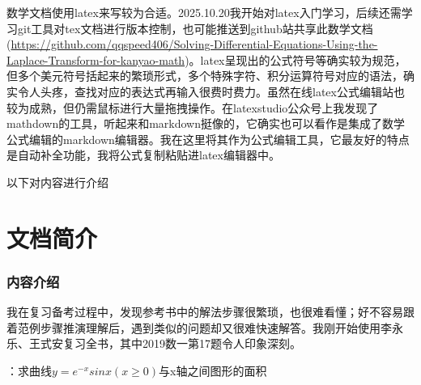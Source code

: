 \documentclass[12pt]{report}
\begin{document}
   数学文档使用latex来写较为合适。2025.10.20我开始对latex入门学习，后续还需学习git工具对tex文档进行版本控制，也可能推送到github站共享此数学文档(\href{https://github.com/qqspeed406/Solving-Differential-Equations-Using-the-Laplace-Transform-for-kanyao-math}{https://github.com/qqspeed406/Solving-Differential-Equations-Using-the-Laplace-Transform-for-kanyao-math})。latex呈现出的公式符号等确实较为规范，但多个美元符号括起来的繁琐形式，多个特殊字符、积分运算符号对应的语法，确实令人头疼，查找对应的表达式再输入很费时费力。虽然在线latex公式编辑站也较为成熟，但仍需鼠标进行大量拖拽操作。在latexstudio公众号上我发现了mathdown的工具，听起来和markdown挺像的，它确实也可以看作是集成了数学公式编辑的markdown编辑器。我在这里将其作为公式编辑工具，它最友好的特点是自动补全功能，我将公式复制粘贴进latex编辑器中。
   
   以下对内容进行介绍
   
   \clearpage
   
   \chapter*{文档简介}
   \subsection*{\centering 内容介绍}
   我在复习备考过程中，发现参考书中的解法步骤很繁琐，也很难看懂；好不容易跟着范例步骤推演理解后，遇到类似的问题却又很难快速解答。我刚开始使用李永乐、王式安复习全书，其中2019数一第17题令人印象深刻。
   
   ：求曲线$y=e^{-x}sinx\left(x\geqslant0\right)$与x轴之间图形的面积
   
   \vspace{10pt}
   
\end{document}
